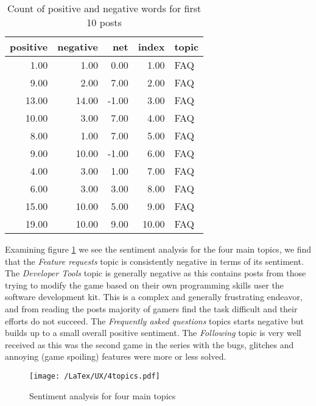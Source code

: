 \documentclass{svproc}
\begin{document}
\begin{table}[h]
\centering \scriptsize
\begin{tabular}{rrrrl}
  \hline
positive & negative & net & index & topic \\ 
  \hline
1.00 & 1.00 & 0.00 & 1.00 & FAQ \\ 
 9.00 & 2.00 & 7.00 & 2.00 & FAQ \\ 
  13.00 & 14.00 & -1.00 & 3.00 & FAQ \\ 
 10.00 & 3.00 & 7.00 & 4.00 & FAQ \\ 
 8.00 & 1.00 & 7.00 & 5.00 & FAQ \\ 
9.00 & 10.00 & -1.00 & 6.00 & FAQ \\ 
 4.00 & 3.00 & 1.00 & 7.00 & FAQ \\ 
 6.00 & 3.00 & 3.00 & 8.00 & FAQ \\ 
 15.00 & 10.00 & 5.00 & 9.00 & FAQ \\ 
19.00 & 10.00 & 9.00 & 10.00 & FAQ \\ 
   \hline
\end{tabular} \normalsize
 \caption{Count of positive and negative words for first 10 posts}
 \label{table1}
\end{table}


Examining figure \ref{sentiment1} we see the sentiment analysis for the four main topics, we find that the {\it Feature requests} topic is consistently negative in terms of its sentiment. The {\it Developer Tools} topic is generally negative as this contains posts from those trying to modify the game based on their own programming skills user the software development kit. This is a complex and generally frustrating endeavor, and from reading the posts majority of gamers find the task difficult and their efforts do not succeed. The {\it Frequently asked questions} topics starts negative but builds up to a small overall positive sentiment. The {\it Following} topic is very well received as this was the second game in the series with the bugs, glitches and annoying (game spoiling) features were more or less solved.

\begin{figure}[hp]
  \begin{center}
 \texttt{[image: /LaTex/UX/4topics.pdf]} %
  \end{center}
 \caption{Sentiment analysis for four main topics}
\label{sentiment1}
\end{figure}
\end{document}

